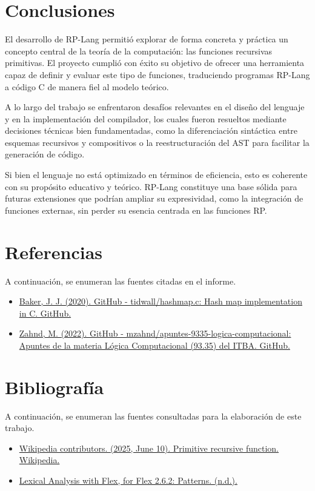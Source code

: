 \documentclass{article}
\begin{document}
\section {Conclusiones}

El desarrollo de RP-Lang permitió explorar de forma concreta y práctica un concepto central de la teoría de la computación: las funciones recursivas primitivas. El proyecto cumplió con éxito su objetivo de ofrecer una herramienta capaz de definir y evaluar este tipo de funciones, traduciendo programas RP-Lang a código C de manera fiel al modelo teórico.

A lo largo del trabajo se enfrentaron desafíos relevantes en el diseño del lenguaje y en la implementación del compilador, los cuales fueron resueltos mediante decisiones técnicas bien fundamentadas, como la diferenciación sintáctica entre esquemas recursivos y compositivos o la reestructuración del AST para facilitar la generación de código.

Si bien el lenguaje no está optimizado en términos de eficiencia, esto es coherente con su propósito educativo y teórico. RP-Lang constituye una base sólida para futuras extensiones que podrían ampliar su expresividad, como la integración de funciones externas, sin perder su esencia centrada en las funciones RP.

\section {Referencias}

A continuación, se enumeran las fuentes citadas en el informe.
\begin{itemize}
\item \href{https://github.com/tidwall/hashmap.c/tree/master}{Baker, J. J. (2020). GitHub - tidwall/hashmap.c: Hash map implementation in C. GitHub.}
\item \href{https://github.com/mzahnd/apuntes-9335-logica-computacional}{Zahnd, M. (2022). GitHub - mzahnd/apuntes-9335-logica-computacional: Apuntes de la materia Lógica Computacional (93.35) del ITBA. GitHub.}
\end{itemize}

\section {Bibliografía}

A continuación, se enumeran las fuentes consultadas para la elaboración de este trabajo.
\begin {itemize}
\item \href{https://en.wikipedia.org/wiki/Primitive_recursive_function}{Wikipedia contributors. (2025, June 10). Primitive recursive function. Wikipedia.}
\item \href{https://westes.github.io/flex/manual/Patterns.html}{Lexical Analysis with Flex, for Flex 2.6.2: Patterns. (n.d.).}
\end {itemize}
\end{document}
